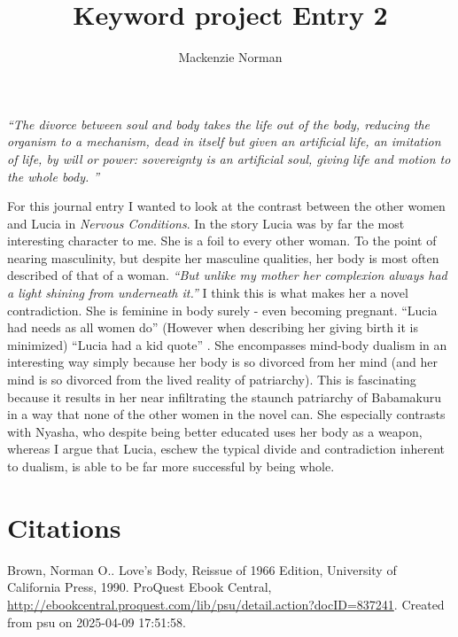 \documentclass{article}
\title{Keyword project Entry 2}
\author{Mackenzie Norman}
\date{}
\begin{document}
\doublespacing 
\maketitle
\textit{``The divorce between soul and body takes the life out of the body, reducing the organism to a mechanism, dead in itself but given an artificial life, an imitation of life, by will or power: sovereignty is an artificial soul, giving life and motion to the whole body. ''}


For this journal entry I wanted to look at the contrast between the other women and Lucia in \textit{Nervous Conditions}. In the story Lucia was by far the most interesting character to me. She is a foil to every other woman. To the point of nearing masculinity, but despite her masculine qualities, her body is most often described of that of a woman. \textit{``But unlike my mother her complexion always had a light shining from underneath it.'' } I think this is what makes her a novel contradiction. She is feminine in body surely - even becoming pregnant. ``Lucia had needs as all women do'' (However when describing her giving birth it is minimized) ``Lucia had a kid quote'' . She encompasses mind-body dualism in an interesting way simply because her body is so divorced from her mind (and her mind is so divorced from the lived reality of patriarchy). This is fascinating because it results in her near infiltrating the staunch patriarchy of Babamakuru in a way that none of the other women in the novel can. She especially contrasts with Nyasha, who despite being better educated uses her body as a weapon, whereas I argue that Lucia, eschew the typical divide and contradiction inherent to dualism, is able to be far more successful by being whole.




\section{Citations}

Brown, Norman O.. Love's Body, Reissue of 1966 Edition, University of California Press, 1990. ProQuest Ebook Central, \url{http://ebookcentral.proquest.com/lib/psu/detail.action?docID=837241}.
Created from psu on 2025-04-09 17:51:58. 
\end{document}
